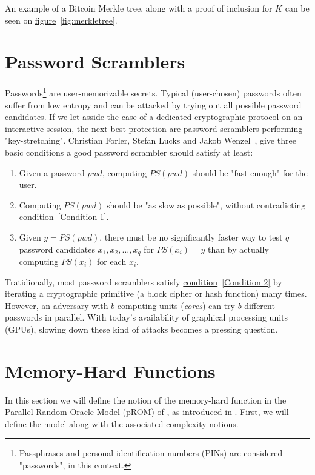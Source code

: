 An example of a Bitcoin Merkle tree, along with a proof of inclusion for $K$ can be seen on \hyperref[fig:merkletree]{figure}~\ref{fig:merkletree}.

%
\section{Password Scramblers}
Passwords\footnote{Passphrases and personal identification numbers (PINs) are considered "passwords", in this context.} are user-memorizable secrets. Typical (user-chosen) passwords often suffer from low entropy and can be attacked by trying out all possible password candidates. If we let asside the case of a dedicated cryptographic protocol on an interactive session, the next best protection are password scramblers performing "key-stretching". Christian Forler, Stefan Lucks and Jakob Wenzel~\cite{ForlerLW13}, give three basic conditions a good password scrambler should satisfy at least:

\begin{enumerate}
  \item \label{Condition 1} Given a password $pwd$, computing $PS(pwd)$ should be "fast enough" for the user.
  \item \label{Condition 2} Computing $PS(pwd)$ should be "as slow as possible", without contradicting \hyperref[Condition 1]{condition}~\ref{Condition 1}.
  \item Given $y=PS(pwd)$, there must be no significantly faster way to test $q$ password candidates $x_1, x_2, \dots, x_q$ for $PS(x_i)=y$ than by actually computing $PS(x_i)$ for each $x_i$.
\end{enumerate}

Tratidionally, most password scramblers satisfy \hyperref[Condition 2]{condition}~\ref{Condition 2} by iterating a cryptographic primitive (a block cipher or hash function) many times. However, an adversary with $b$ computing units (\emph{cores}) can try $b$ different passwords in parallel. With today's availability of graphical processing units (GPUs), slowing down these kind of attacks becomes a pressing question.

\section{Memory-Hard Functions} \label{sec:memory-hard}
In this section we will define the notion of the memory-hard function in the Parallel Random Oracle Model (pROM) of \cite{Alwen:2015:HPC:2746539.2746622}, as introduced in \cite{cryptoeprint:2016:875}. First, we will define the model along with the associated complexity notions.

